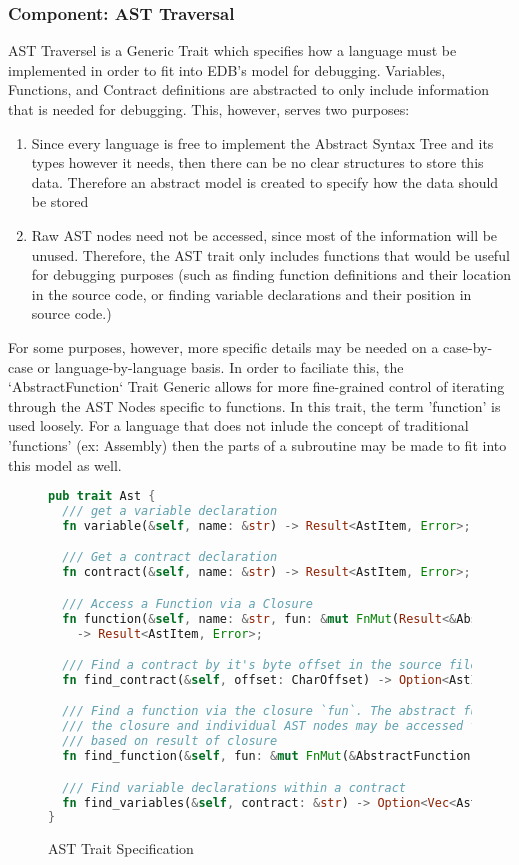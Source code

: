 \documentclass{report}
\begin{document}
	\subsubsection{Component: AST Traversal}
		AST Traversel is a Generic Trait which specifies how a language must be implemented in order to fit into EDB's model for debugging. Variables, Functions, and Contract definitions are abstracted to only include information that is needed for debugging. This, however, serves two purposes:
	\begin{enumerate}
		\item Since every language is free to implement the Abstract Syntax Tree and its types however it needs, then there can be no clear structures to store this data. Therefore an abstract model is created to specify how the data should be stored
		\item Raw AST nodes need not be accessed, since most of the information will be unused. Therefore, the AST trait only includes functions that would be useful for debugging purposes (such as finding function definitions and their location in the source code, or finding variable declarations and their position in source code.)
	\end{enumerate}
	For some purposes, however, more specific details may be needed on a case-by-case or language-by-language basis. In order to faciliate this, the `AbstractFunction` Trait Generic allows for more fine-grained control of iterating through the AST Nodes specific to functions. In this trait, the term 'function' is used loosely. For a language that does not inlude the concept of traditional 'functions' (ex: Assembly) then the parts of a subroutine may be made to fit into this model as well.

\begin{figure}[!h]
    \begin{lstlisting}[language=Rust,basicstyle=\footnotesize]
pub trait Ast {
  /// get a variable declaration
  fn variable(&self, name: &str) -> Result<AstItem, Error>;

  /// Get a contract declaration
  fn contract(&self, name: &str) -> Result<AstItem, Error>;

  /// Access a Function via a Closure
  fn function(&self, name: &str, fun: &mut FnMut(Result<&AbstractFunction, Error>) -> bool)
    -> Result<AstItem, Error>;

  /// Find a contract by it's byte offset in the source file
  fn find_contract(&self, offset: CharOffset) -> Option<AstItem>;

  /// Find a function via the closure `fun`. The abstract function from AST is passed into
  /// the closure and individual AST nodes may be accessed through it. Returns an AST item
  /// based on result of closure
  fn find_function(&self, fun: &mut FnMut(&AbstractFunction) -> bool) -> Option<AstItem>;

  /// Find variable declarations within a contract
  fn find_variables(&self, contract: &str) -> Option<Vec<AstItem>>;
}
    \end{lstlisting}
    \caption{AST Trait Specification}
\end{figure}
\end{document}
